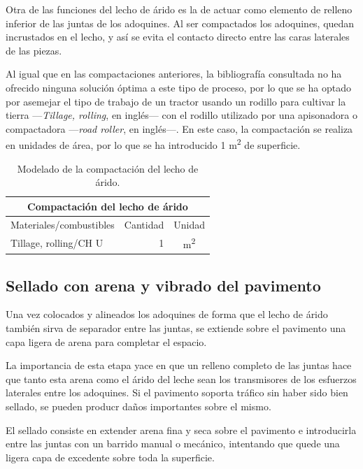 Otra de las funciones del lecho de árido es la de actuar como elemento de relleno inferior de las juntas de los adoquines. Al ser compactados los adoquines, quedan incrustados en el lecho, y así se evita el contacto directo entre las caras laterales de las piezas.


Al igual que en las compactaciones anteriores, la bibliografía consultada no ha ofrecido ninguna solución óptima a este tipo de proceso, por lo que se ha optado por asemejar el tipo de trabajo de un tractor usando un rodillo para cultivar la tierra —\textit{Tillage, rolling}, en inglés— con el rodillo utilizado por una apisonadora o compactadora —\textit{road roller}, en inglés—. En este caso, la compactación se realiza en unidades de área, por lo que se ha introducido 1 \si{m^2} de superficie.

\begin{table}[!htb]
\centering
\begin{tabular}{p{8cm}rc}
\toprule
\multicolumn{3}{c}{Compactación del lecho de árido}\\
\midrule
Materiales/combustibles & Cantidad & Unidad\\
\midrule
Tillage, rolling/CH U & 1 & \si{m^2}\\
\bottomrule
\end{tabular}
\caption{Modelado de la compactación del lecho de árido.}
\label{modeladolecho}
\end{table}

\subsection{Sellado con arena y vibrado del pavimento}\label{sec:selladoinstalacion}

Una vez colocados y alineados los adoquines de forma que el lecho de árido también sirva de separador entre las juntas, se extiende sobre el pavimento una capa ligera de arena para completar el espacio.

La importancia de esta etapa yace en que un relleno completo de las juntas hace que tanto esta arena como el árido del leche sean los transmisores de los esfuerzos laterales entre los adoquines. Si el pavimento soporta tráfico sin haber sido bien sellado, se pueden producr daños importantes sobre el mismo.

El sellado consiste en extender arena fina y seca sobre el pavimento e introducirla entre las juntas con un barrido manual o mecánico, intentando que quede una ligera capa de excedente sobre toda la superficie.

